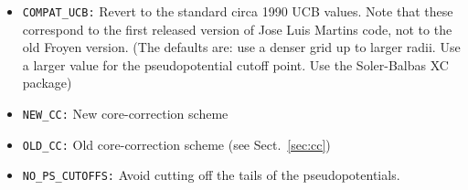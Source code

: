 \documentclass[11pt]{article}
\begin{document}
\begin{itemize}
\item {\tt COMPAT\_UCB:}  Revert to the standard circa 1990 UCB values. Note   
                   that these correspond to the first released version 
                   of Jose Luis Martins code, not to the old Froyen        
                   version.
     (The defaults are: use a denser grid up to larger radii.
              Use a larger value for the pseudopotential
cutoff point.  Use the Soler-Balbas XC package)  
                                                                          
\item  {\tt NEW\_CC:} New core-correction scheme
\item {\tt OLD\_CC:}  Old core-correction scheme  (see Sect.~\ref{sec:cc})
 
\item {\tt NO\_PS\_CUTOFFS:} Avoid cutting off the tails of the pseudopotentials.
\end{itemize}


\end{document}
